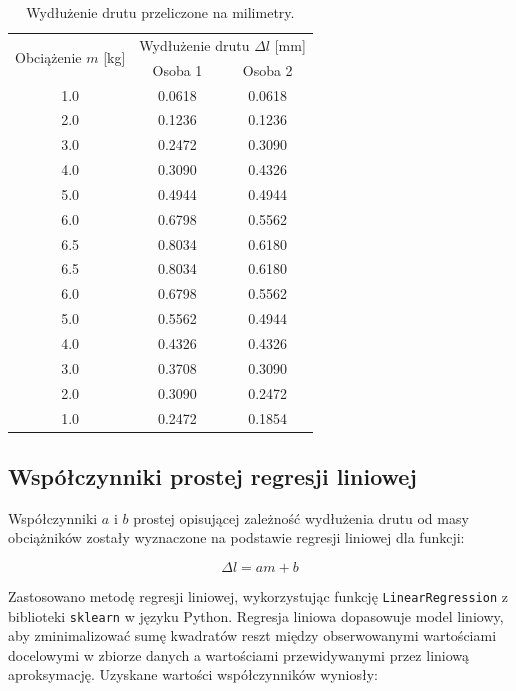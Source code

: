 \documentclass[a4paper,12pt]{article}
\begin{document}
\begin{table}[h]
    \centering
    \begin{tabular}{|c|c|c|}
        \hline
        \multirow{2}{*}{Obciążenie $m$ [kg]} & \multicolumn{2}{c|}{Wydłużenie drutu $\Delta l$ [mm]} \\
        \cline{2-3}
        & Osoba 1 & Osoba 2 \\
        \hline
        1.0  & 0.0618  & 0.0618  \\ \hline
        2.0  & 0.1236  & 0.1236  \\ \hline
        3.0  & 0.2472  & 0.3090  \\ \hline
        4.0  & 0.3090  & 0.4326  \\ \hline
        5.0  & 0.4944  & 0.4944  \\ \hline
        6.0  & 0.6798  & 0.5562  \\ \hline
        6.5  & 0.8034  & 0.6180  \\ \hline
        6.5  & 0.8034  & 0.6180  \\ \hline
        6.0  & 0.6798  & 0.5562  \\ \hline
        5.0  & 0.5562  & 0.4944  \\ \hline
        4.0  & 0.4326  & 0.4326  \\ \hline
        3.0  & 0.3708  & 0.3090  \\ \hline
        2.0  & 0.3090  & 0.2472  \\ \hline
        1.0  & 0.2472  & 0.1854  \\ \hline
    \end{tabular}
    \caption{Wydłużenie drutu przeliczone na milimetry.}
    \label{tab:wydluzenie_drutu}
\end{table}

\subsection{Współczynniki prostej regresji liniowej}

Współczynniki \( a \) i \( b \) prostej opisującej zależność wydłużenia drutu od masy obciążników zostały wyznaczone na podstawie regresji liniowej dla funkcji:

\begin{equation} \label{eq:prosta_regresji}
\Delta l = a m + b
\end{equation}

Zastosowano metodę regresji liniowej, wykorzystując funkcję \texttt{LinearRegression} z biblioteki \texttt{sklearn} w języku Python.
Regresja liniowa dopasowuje model liniowy, aby zminimalizować sumę kwadratów reszt między obserwowanymi wartościami docelowymi w zbiorze danych a wartościami przewidywanymi przez liniową aproksymację.
Uzyskane wartości współczynników wyniosły:
\end{document}
